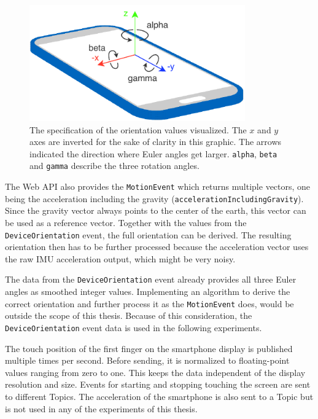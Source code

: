 \begin{figure}[H]
	\centering
	\includegraphics[height=5cm]{figures/implementation/webapi_device_orientation.pdf}
	\caption[Smart device coordinate system and orientation values]{The specification of the orientation values visualized. The \(x\) and \(y\) axes are inverted for the sake of clarity in this graphic. The arrows indicated the direction where Euler angles get larger. \lstinline{alpha}, \lstinline{beta} and \lstinline{gamma} describe the three rotation angles.}\label{fig:webapi-device-orientation}
\end{figure}

The Web \gls{API} also provides the \lstinline{MotionEvent} which returns multiple vectors, one being the acceleration including the gravity (\lstinline{accelerationIncludingGravity}). Since the gravity vector always points to the center of the earth, this vector can be used as a reference vector. Together with the values from the \lstinline{DeviceOrientation} event, the full orientation can be derived. The resulting orientation then has to be further processed because the acceleration vector uses the raw \gls{IMU} acceleration output, which might be very noisy.

The data from the \lstinline{DeviceOrientation} event already provides all three Euler angles as smoothed integer values. Implementing an algorithm to derive the correct orientation and further process it as the \lstinline{MotionEvent} does, would be outside the scope of this thesis. Because of this consideration, the \lstinline{DeviceOrientation} event data is used in the following experiments.

The touch position of the first finger on the smartphone display is published multiple times per second. Before sending, it is normalized to floating-point values ranging from zero to one. This keeps the data independent of the display resolution and size. Events for starting and stopping touching the screen are sent to different Topics. The acceleration of the smartphone is also sent to a Topic but is not used in any of the experiments of this thesis.


